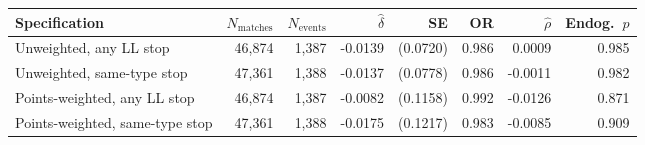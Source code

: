 \begin{tabular}{lrrrrrrr}
\toprule
Specification & $N_{\text{matches}}$ & $N_{\text{events}}$ & $\hat{\delta}$ & SE & OR & $\hat{\rho}$ & Endog.\ $p$ \\
\midrule
Unweighted, any LL stop & 46,874 & 1,387 & -0.0139 & (0.0720) & 0.986 & 0.0009 & 0.985 \\
Unweighted, same-type stop & 47,361 & 1,388 & -0.0137 & (0.0778) & 0.986 & -0.0011 & 0.982 \\
Points-weighted, any LL stop & 46,874 & 1,387 & -0.0082 & (0.1158) & 0.992 & -0.0126 & 0.871 \\
Points-weighted, same-type stop & 47,361 & 1,388 & -0.0175 & (0.1217) & 0.983 & -0.0085 & 0.909 \\
\bottomrule
\end{tabular}
